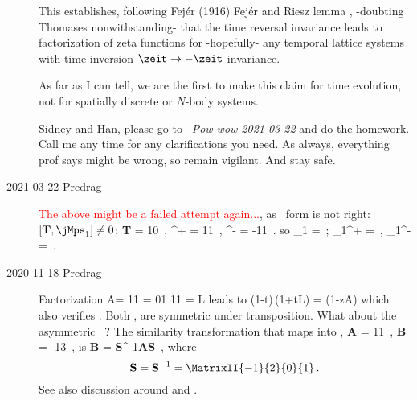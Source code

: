 \begin{description}
This establishes, following Fej{\'e}r (1916) Fej\'er
and Riesz lemma , -doubting Thomases
non\-with\-standing- that the time reversal invariance leads to
factorization of zeta functions for -hopefully- any temporal lattice
systems with time-inversion $\zeit \to -\zeit$ invariance.

As far as I can tell, we are the first to make this claim for
time evolution, not for spatially discrete or $N$-body systems.

Sidney and Han, please go to ~{\em Pow wow
2021-03-22} and do the homework. Call me any time for any clarifications
you need. As always, everything prof says might be wrong, so remain
vigilant. And stay safe.

    \item[2021-03-22 Predrag]
    {\textcolor{red}{The above might be a failed attempt again...}}, as
\PV\ form is not right: $[{\bf T},{\mathbf{\jMps}}_1]\neq0$:
\beq
{\bf T}
=
          {1}{0}
\,,\qquad
{\bf \PP}^{+} = 
          {1}{1}
\,,\;
{\bf \PP}^{-} = 
          {-1}{1}
\,.
so
\beq
 {\hat{\mathbf{\jMps}}_1}
=
 \left[\begin{array}{cc}
 0 & 1 \\
 -1 & s
 \end{array} \right]
\,;\qquad
 {\hat{\mathbf{\jMps}}_1^{+}}
= 
 \left[\begin{array}{cc}
 1   & 1 \\
 s-1 & s-1
 \end{array} \right]
\,,\;
 {\hat{\mathbf{\jMps}}_1^{-}}
= 
 \left[\begin{array}{cc}
 -1   & 1 \\
-s-1 & s+1
 \end{array} \right]
\,.


    \item[2020-11-18 Predrag]
Factorization 
\beq
A=
         {1}{1}
=
         {0}{1}
         {1}{1}
= L
leads to
\beq
\det(1-t)\,\det(1+tL)
    =  {\det(1-zA)}
which also verifies . Both ,
 are symmetric under transposition. What about the
asymmetric \PV\ ? The similarity transformation
 that maps  into
,
\beq
{\bf A}
=
          {1}{1}
\,,\qquad
{\bf B}
=
          {-1}{3}
\,,
is
\beq
{\bf B} = {\bf S}^{-1}{\bf A}{\bf S}
\,,
where
\[
{\bf S} = {\bf S}^{-1}
        =\MatrixII{-1}{2}
				   {0}{1}
\,.
\]
See also discussion around  and .


\end{description}
